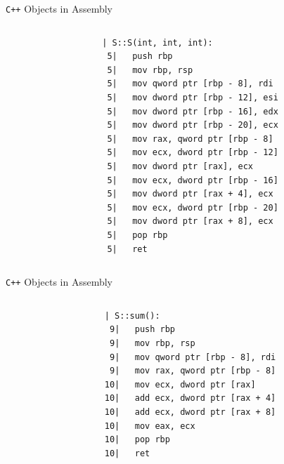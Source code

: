 \documentclass[compress,aspectratio=1610]{beamer}
\newcommand{\inputcpplisting}[1]{}
\begin{document}
\begin{frame}[fragile]{\texttt{C++} Objects in Assembly}
    \begin{columns}[t]
        \begin{column}{.45\textwidth}
            \inputcpplisting{snippet20}
        \end{column}
        \begin{column}{.45\textwidth}
            \begin{lstlisting}[language={},morekeywords={rdi},numbers=none]
  | S::S(int, int, int):
 5|   push rbp
 5|   mov rbp, rsp
 5|   mov qword ptr [rbp - 8], rdi
 5|   mov dword ptr [rbp - 12], esi
 5|   mov dword ptr [rbp - 16], edx
 5|   mov dword ptr [rbp - 20], ecx
 5|   mov rax, qword ptr [rbp - 8]
 5|   mov ecx, dword ptr [rbp - 12]
 5|   mov dword ptr [rax], ecx
 5|   mov ecx, dword ptr [rbp - 16]
 5|   mov dword ptr [rax + 4], ecx
 5|   mov ecx, dword ptr [rbp - 20]
 5|   mov dword ptr [rax + 8], ecx
 5|   pop rbp
 5|   ret
            \end{lstlisting}
        \end{column}
    \end{columns}
\end{frame}

\begin{frame}[fragile]{\texttt{C++} Objects in Assembly}
    \begin{columns}[t]
        \begin{column}{.45\textwidth}
            \inputcpplisting{snippet20}
        \end{column}
        \begin{column}{.45\textwidth}
            \begin{lstlisting}[language={},morekeywords={rdi},numbers=none]
  | S::sum():
 9|   push rbp
 9|   mov rbp, rsp
 9|   mov qword ptr [rbp - 8], rdi
 9|   mov rax, qword ptr [rbp - 8]
10|   mov ecx, dword ptr [rax]
10|   add ecx, dword ptr [rax + 4]
10|   add ecx, dword ptr [rax + 8]
10|   mov eax, ecx
10|   pop rbp
10|   ret
            \end{lstlisting}
        \end{column}
    \end{columns}
\end{frame}
\end{document}

